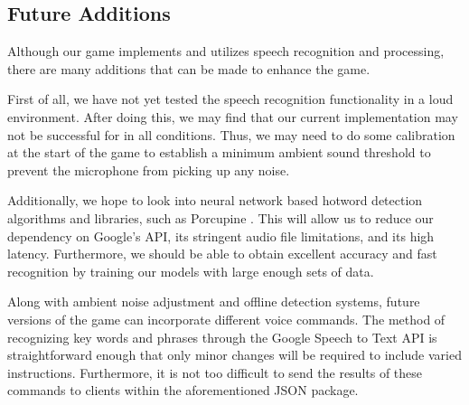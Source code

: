 \documentclass[titlepage, 12pt]{scrartcl}
\begin{document}
    \subsection{Future Additions}
        Although our game implements and utilizes speech recognition and processing, there are many additions that can be made to enhance the game. \par
        First of all, we have not yet tested the speech recognition functionality in a loud environment. After doing this, we may find that our current implementation may not be successful for in all conditions. Thus, we may need to do some calibration at the start of the game to establish a minimum ambient sound threshold to prevent the microphone from picking up any noise. \par
        Additionally, we hope to look into neural network based hotword detection algorithms and libraries, such as Porcupine \cite{picovoice_2018}. This will allow us to reduce our dependency on Google's API, its stringent audio file limitations, and its high latency. Furthermore, we should be able to obtain excellent accuracy and fast recognition by training our models with large enough sets of data. \par
        Along with ambient noise adjustment and offline detection systems, future versions of the game can incorporate different voice commands. The method of recognizing key words and phrases through the Google Speech to Text API is straightforward enough that only minor changes will be required to include varied instructions. Furthermore, it is not too difficult to send the results of these commands to clients within the aforementioned JSON package. \par
\end{document}
